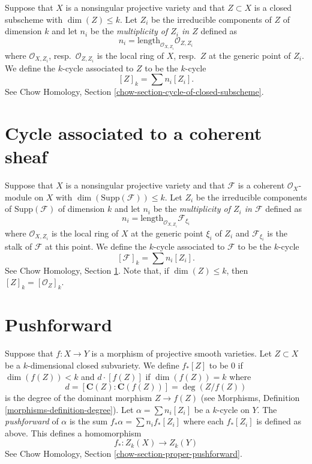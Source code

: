 \noindent
Suppose that $X$ is a nonsingular projective variety and that $Z \subset X$
is a closed subscheme with $\dim(Z) \leq k$. Let $Z_i$ be the irreducible
components of $Z$ of dimension $k$ and let $n_i$ be the
{\it multiplicity of $Z_i$ in $Z$} defined as
$$
n_i = \text{length}_{\mathcal{O}_{X, Z_i}} \mathcal{O}_{Z, Z_i}
$$
where $\mathcal{O}_{X, Z_i}$, resp.\ $\mathcal{O}_{Z, Z_i}$ is the
local ring of $X$, resp.\ $Z$ at the generic point of $Z_i$. 
We define the $k$-cycle associated to $Z$ to be the $k$-cycle
$$
[Z]_k = \sum n_i [Z_i].
$$
See Chow Homology, Section \ref{chow-section-cycle-of-closed-subscheme}.


\section{Cycle associated to a coherent sheaf}
\label{section-cycle-of-coherent-sheaf}

\noindent
Suppose that $X$ is a nonsingular projective variety and that $\mathcal{F}$
is a coherent $\mathcal{O}_X$-module on $X$ with 
$\dim(\text{Supp}(\mathcal{F})) \leq k$.
Let $Z_i$ be the irreducible components of $\text{Supp}(\mathcal{F})$
of dimension $k$ and let $n_i$ be the
{\it multiplicity of $Z_i$ in $\mathcal{F}$} defined as
$$
n_i = \text{length}_{\mathcal{O}_{X, Z_i}} \mathcal{F}_{\xi_i}
$$
where $\mathcal{O}_{X, Z_i}$ is the
local ring of $X$ at the generic point $\xi_i$ of $Z_i$
and $\mathcal{F}_{\xi_i}$ is the stalk of $\mathcal{F}$ at this point.
We define the $k$-cycle associated to $\mathcal{F}$ to be the $k$-cycle
$$
[\mathcal{F}]_k = \sum n_i [Z_i].
$$
See Chow Homology, Section \ref{section-cycle-of-coherent-sheaf}.
Note that, if $\dim(Z) \leq k$, then $[Z]_k = [\mathcal{O}_Z]_k$.


\section{Pushforward}
\label{section-pushforward}

\noindent
Suppose that $f : X \to Y$ is a morphism of projective smooth varieties.
Let $Z \subset X$ be a $k$-dimensional
closed subvariety. We define $f_*[Z]$ to be $0$ if $\dim(f(Z))<k$
and $d \cdot [f(Z)]$ if $\dim(f(Z)) = k$ where
$$
d = [\mathbf{C}(Z) : \mathbf{C}(f(Z))] = \deg(Z/f(Z))
$$
is the degree of the dominant morphism $Z \to f(Z)$ (see
Morphisms, Definition \ref{morphisms-definition-degree}).
Let $\alpha = \sum n_i [Z_i]$ be a $k$-cycle on $Y$. The
{\it pushforward} of $\alpha$ is the sum $f_* \alpha = \sum n_i f_*[Z_i]$
where each $f_*[Z_i]$ is defined as above. This defines a homomorphism
$$
f_* : Z_k(X) \longrightarrow Z_k(Y)
$$
See Chow Homology, Section \ref{chow-section-proper-pushforward}.

